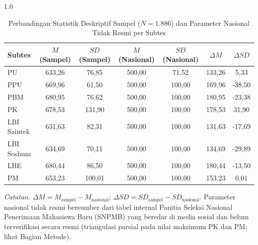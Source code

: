 \begin{table}[H]
    \centering
    \caption{Perbandingan Statistik Deskriptif Sampel ($N=1.886$) dan Parameter Nasional Tidak Resmi per Subtes}
    \label{tab:deskriptif}
    \begin{spacing}{1.0}
    \begin{tabular}{lcccccc}
        \toprule
        Subtes & $M$ (Sampel) & $SD$ (Sampel) & $M$ (Nasional) & $SD$ (Nasional) & $\Delta M$ & $\Delta SD$ \\
        \midrule
        PU              & 633,26 & 76,85 & 500,00 & 71,52 & 133,26 & 5,33 \\
        PPU             & 669,96 & 61,50 & 500,00 & 100,00 & 169,96 & -38,50 \\
        PBM             & 680,95 & 76,62 & 500,00 & 100,00 & 180,95 & -23,38 \\
        PK              & 678,53 & 131,90 & 500,00 & 100,00 & 178,53 & 31,90 \\
        LBI Saintek     & 631,63 & 82,31 & 500,00 & 100,00 & 131,63 & -17,69 \\
        LBI Soshum      & 634,69 & 70,11 & 500,00 & 100,00 & 134,69 & -29,89 \\
        LBE             & 680,44 & 86,50 & 500,00 & 100,00 & 180,44 & -13,50 \\
        PM              & 653,23 & 100,01 & 500,00 & 100,00 & 153,23 & 0,01 \\
        \bottomrule
    \end{tabular}
    \end{spacing}
    \vspace{2mm}
    \begin{flushleft}
    \footnotesize\textit{Catatan.} $\Delta M = M_{\text{sampel}} - M_{\text{nasional}}$; $\Delta SD = SD_{\text{sampel}} - SD_{\text{nasional}}$. Parameter nasional tidak resmi bersumber dari tabel internal Panitia Seleksi Nasional Penerimaan Mahasiswa Baru (SNPMB) yang beredar di media sosial dan belum terverifikasi secara resmi (triangulasi parsial pada nilai maksimum PK dan PM; lihat Bagian Metode).
    \end{flushleft}
\end{table}
